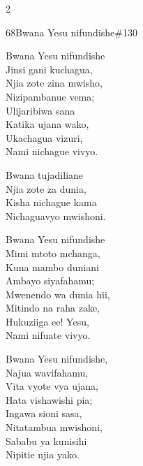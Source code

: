 \begin{multicols}{2}
\begin{hymn}{68}{Bwana Yesu nifundishe}{\#130}
\begin{stanza}
Bwana Yesu nifundishe\\
Jinsi gani kuchagua,\\
Njia zote zina mwisho,\\
Nizipambanue vema;\\
Ulijaribiwa sana\\
Katika ujana wako,\\
Ukachagua vizuri,\\
Nami nichague vivyo.
\end{stanza}
\begin{chorus}
Bwana tujadiliane\\
Njia zote za dunia,\\
Kisha nichague kama\\
Nichaguavyo mwishoni.
\end{chorus}
\begin{stanza}
Bwana Yesu nifundishe\\
Mimi mtoto mchanga,\\
Kuna mambo duniani\\
Ambayo siyafahamu;\\
Mwenendo wa dunia hii,\\
Mitindo na raha zake,\\
Hukuziiga ee! Yesu,\\
Nami nifuate vivyo.
\end{stanza}
\begin{stanza}
Bwana Yesu nifundishe,\\
Najua wavifahamu,\\
Vita vyote vya ujana,\\
Hata vishawishi pia;\\
Ingawa sioni sasa,\\
Nitatambua mwishoni,\\
Sababu ya kunisihi\\
Nipitie njia yako.
\end{stanza}
\end{hymn}


\end{multicols}
